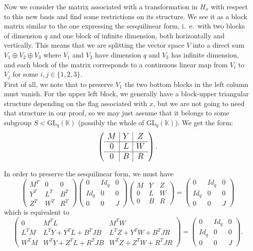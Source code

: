\documentclass{article}
\theoremstyle{definition}
\theoremstyle{remark}
\theoremstyle{plain}
\begin{document}
Now we consider the matrix associated with a transformation in $H_x$ with respect to this new basis and find some restrictions on its structure. We see it as a block matrix similar to the one expressing the sesquilinear form, i.~e.~with two blocks of dimension $q$ and one block of infinite dimension, both horizontally and vertically. This means that we are splitting the vector space $V$ into a direct sum $V_1\oplus V_2\oplus V_3$ where $V_1$ and $V_2$ have dimension $q$ and $V_3$ has infinite dimension, and each block of the matrix corresponds to a continuous linear map from $V_i$ to $V_j$ for some $i,j\in\{1,2,3\}$. \\

First of all, we note that to preserve $V_1$ the two bottom blocks in the left column must vanish. For the upper left block, we generally have a block-upper triangular structure depending on the flag associated with $x$, but we are not going to need that structure in our proof, so we may just assume that it belongs to some subgroup $S<\mathrm{GL}_q(\mathbb{K})$ (possibly the whole of $\mathrm{GL}_q(\mathbb{K})$). We get the form: $$\large \left(\begin{array}{c|c|c}
    M & Y & Z \\
    \hline
    0 & L & W \\
    \hline
    0 & B & R
\end{array}\right).$$

In order to preserve the sesquilinear form, we must have $$\left(\begin{array}{c|c|c}
    M^T & 0 & 0 \\
    \hline
    Y^T & L^T & B^T \\
    \hline
    Z^T & W^T & R^T
\end{array}\right)\left(\begin{array}{c|c|c}
    0 & Id_q & 0 \\
    \hline
    Id_q & 0 & 0 \\
    \hline
    0 & 0 & J
\end{array}\right)\left(\begin{array}{c|c|c}
    M & Y & Z \\
    \hline
    0 & L & W \\
    \hline
    0 & B & R
\end{array}\right)=\left(\begin{array}{c|c|c}
    0 & Id_q & 0 \\
    \hline
    Id_q & 0 & 0 \\
    \hline
    0 & 0 & J
\end{array}\right)$$ which is equivalent to $$\left(\begin{array}{c|c|c}
    0 & M^T L & M^T W \\
    \hline
    L^T M & L^T Y + Y^T L + B^T J B & L^T Z + Y^T W + B^T J R \\
    \hline
    W^T M & W^T Y + Z^T L + R^T J B & W^T Z + Z^T W + R^T J R
\end{array}\right)=\left(\begin{array}{c|c|c}
    0 & Id_q & 0 \\
    \hline
    Id_q & 0 & 0 \\
    \hline
    0 & 0 & J
\end{array}\right).$$
\end{document}
